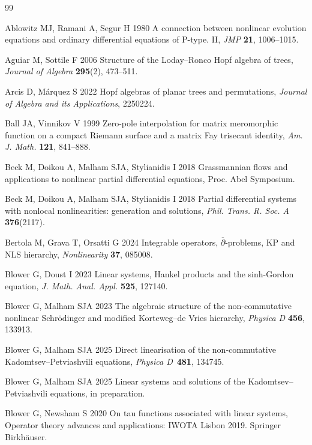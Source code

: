 \documentclass[5p,twocolumn]{elsarticle}
\newcommand*{\pa}{{\partial}}
\begin{document}
\begin{thebibliography}{99}
  
 Ablowitz MJ, Ramani A, Segur H 1980 A connection between nonlinear evolution equations and ordinary differential equations of P-type. II, \textit{JMP} \textbf{21}, 1006--1015. 

 Aguiar M, Sottile F 2006 Structure of the Loday--Ronco Hopf algebra of trees, \textit{Journal of Algebra} \textbf{295}(2), 473--511.

 Arcis D, M\'arquez S 2022 Hopf algebras of planar trees and permutations, \textit{Journal of Algebra and its Applications}, 2250224.
  
 Ball JA, Vinnikov V 1999 Zero-pole interpolation for matrix meromorphic function on a compact Riemann surface and a matrix Fay trisecant identity, \textit{Am. J. Math.\/} \textbf{121}, 841--888.  

 Beck M, Doikou A, Malham SJA, Stylianidis I 2018 Grassmannian flows and applications to nonlinear partial differential equations, Proc. Abel Symposium.  

 Beck M, Doikou A, Malham SJA, Stylianidis I 2018 Partial differential systems with nonlocal nonlinearities: generation and solutions, \textit{Phil. Trans. R. Soc. A} \textbf{376}(2117).

 Bertola M, Grava T, Orsatti G 2024 Integrable operators, $\overline{\pa}$-problems, KP and NLS hierarchy, \textit{Nonlinearity} \textbf{37}, 085008.

 Blower G, Doust I 2023 Linear systems, Hankel products and the sinh-Gordon equation, \textit{J. Math. Anal. Appl.\/} \textbf{525}, 127140.  

 Blower G, Malham SJA 2023 The algebraic structure of the non-commutative nonlinear Schr\"odinger and modified Korteweg--de Vries hierarchy, \textit{Physica D} \textbf{456}, 133913.  

 Blower G, Malham SJA 2025 Direct linearisation of the non-commutative Kadomtsev--Petviashvili equations, \textit{Physica D}~\textbf{481}, 134745.
  
 Blower G, Malham SJA 2025 Linear systems and solutions of the Kadomtsev--Petviashvili equations, in preparation.

 Blower G, Newsham S 2020 On tau functions associated with linear systems, Operator theory advances and applications: IWOTA Lisbon 2019. Springer Birkhäuser.  


\end{thebibliography}
\end{document}
